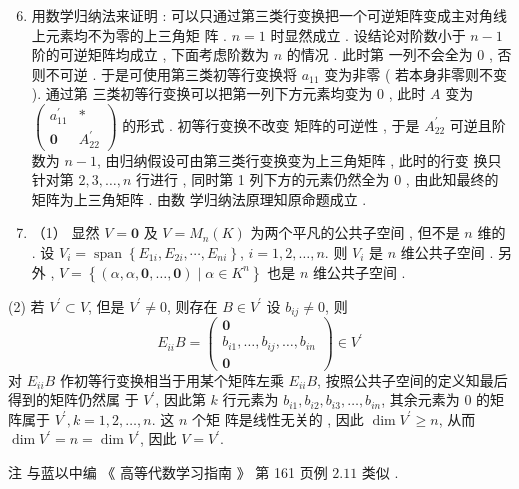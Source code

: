 \documentclass[10pt]{article}
\begin{document}
\begin{enumerate}
  \setcounter{enumi}{5}
  \item  用数学归纳法来证明 :  可以只通过第三类行变换把一个可逆矩阵变成主对角线上元素均不为零的上三角矩   阵 . $n=1$  时显然成立 .  设结论对阶数小于  $n-1$  阶的可逆矩阵均成立 ,  下面考虑阶数为  $n$  的情况 .  此时第   一列不会全为  0 ,  否则不可逆 .  于是可使用第三类初等行变换将  $a_{11}$  变为非零  ( 若本身非零则不变 ).  通过第   三类初等行变换可以把第一列下方元素均变为  0 ,  此时  $A$  变为  $\left(\begin{array}{cc}a_{11}^{\prime} & * \\ \mathbf{0} & A_{22}^{\prime}\end{array}\right)$  的形式 .  初等行变换不改变   矩阵的可逆性 ,  于是  $A_{22}^{\prime}$  可逆且阶数为  $n-1$,  由归纳假设可由第三类行变换变为上三角矩阵 ,  此时的行变   换只针对第  $2,3, \ldots, n$  行进行 ,  同时第  1  列下方的元素仍然全为  0 ,  由此知最终的矩阵为上三角矩阵 .  由数   学归纳法原理知原命题成立 .

  \item （1）  显然  $V=\mathbf{0}$  及  $V=M_{n}(K)$  为两个平凡的公共子空间 ,  但不是  $n$  维的 .  设  $V_{i}=\operatorname{span}\left\{E_{1 i}, E_{2 i}, \cdots, E_{n i}\right\}$, $i=1,2, \ldots, n$.  则  $V_{i}$  是  $n$  维公共子空间 .  另外 , $V=\left\{(\alpha, \alpha, \mathbf{0}, \ldots, \mathbf{0}) \mid \alpha \in K^{n}\right\}$  也是  $n$  维公共子空间 .

\end{enumerate}
(2)  若  $V^{\prime} \subset V$,  但是  $V^{\prime} \neq 0$,  则存在  $B \in V^{\prime}$  设  $b_{i j} \neq 0$,  则 
$$
E_{i i} B=\left(\begin{array}{c}
\mathbf{0} \\
b_{i 1}, \ldots, b_{i j}, \ldots, b_{i n} \\
\mathbf{0}
\end{array}\right) \in V^{\prime}
$$
 对  $E_{i i} B$  作初等行变换相当于用某个矩阵左乘  $E_{i i} B$,  按照公共子空间的定义知最后得到的矩阵仍然属   于  $V^{\prime}$,  因此第  $k$  行元素为  $b_{i 1}, b_{i 2}, b_{i 3}, \ldots, b_{i n}$,  其余元素为  0  的矩阵属于  $V^{\prime}, k=1,2, \ldots, n$.  这  $n$  个矩   阵是线性无关的 ,  因此  $\operatorname{dim} V^{\prime} \geq n$,  从而  $\operatorname{dim} V^{\prime}=n=\operatorname{dim} V^{\prime}$,  因此  $V=V^{\prime}$.

 注   与蓝以中编 《 高等代数学习指南 》 第  161  页例  $2.11$  类似 .
\end{document}
